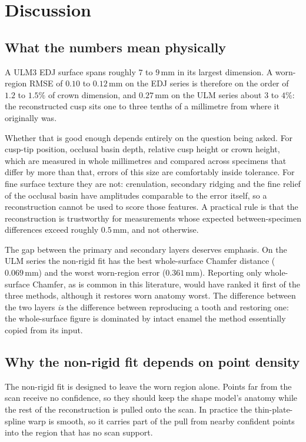 \documentclass[10pt,a4paper,twocolumn]{article}
\newcommand{\mm}{\,\mathrm{mm}}
\begin{document}
\section{Discussion}
\label{sec:discussion}

\subsection{What the numbers mean physically}

A ULM3 EDJ surface spans roughly $7$ to $9\mm$ in its largest dimension. A
worn-region RMSE of $0.10$ to $0.12\mm$ on the EDJ series is therefore on the order
of $1.2$ to $1.5\%$ of crown dimension, and $0.27\mm$ on the ULM series about $3$ to
$4\%$: the reconstructed cusp sits one to three tenths of a millimetre from where
it originally was.

Whether that is good enough depends entirely on the question being asked. For
cusp-tip position, occlusal basin depth, relative cusp height or crown height,
which are measured in whole millimetres and compared across specimens that
differ by more than that, errors of this size are comfortably inside tolerance.
For fine surface texture they are not: crenulation, secondary ridging and the
fine relief of the occlusal basin have amplitudes comparable to the error itself,
so a reconstruction cannot be used to score those features. A practical rule is
that the reconstruction is trustworthy for measurements whose expected
between-specimen differences exceed roughly $0.5\mm$, and not otherwise.

The gap between the primary and secondary layers deserves emphasis. On the ULM
series the non-rigid fit has the best whole-surface Chamfer distance
($0.069\mm$) and the worst worn-region error ($0.361\mm$). Reporting only
whole-surface Chamfer, as is common in this literature, would have ranked it
first of the three methods, although it restores worn anatomy worst. The
difference between the two layers \emph{is} the difference between reproducing
a tooth and restoring one: the whole-surface figure is dominated by intact enamel
the method essentially copied from its input.

\subsection{Why the non-rigid fit depends on point density}
\label{sec:density}

The non-rigid fit is designed to leave the worn region alone. Points far from the
scan receive no confidence, so they should keep the shape model's anatomy while
the rest of the reconstruction is pulled onto the scan. In practice the
thin-plate-spline warp is smooth, so it carries part of the pull from nearby
confident points into the region that has no scan support.
\end{document}
